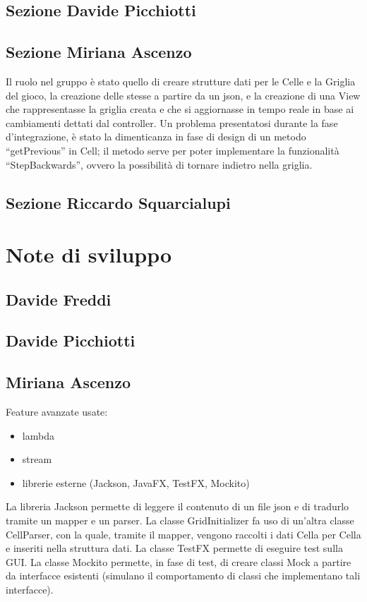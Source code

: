 \documentclass[a4paper,12pt]{report}
\begin{document}
	\subsection{Sezione Davide Picchiotti}
	\subsection{Sezione Miriana Ascenzo}

	Il ruolo nel gruppo è stato quello di creare strutture dati per le Celle e la Griglia del gioco, la creazione delle stesse a partire da un json, e la creazione di una View che rappresentasse la griglia creata e che si aggiornasse in tempo reale in base ai cambiamenti dettati dal controller.
	Un problema presentatosi durante la fase d’integrazione, è stato la dimenticanza in fase di design di un metodo “getPrevious” in Cell; il metodo serve per poter implementare la funzionalità “StepBackwards”, ovvero la possibilità di tornare indietro nella griglia.

	\subsection{Sezione Riccardo Squarcialupi}


	\section{Note di sviluppo}

	\subsection{Davide Freddi}
	\subsection{Davide Picchiotti}
	\subsection{Miriana Ascenzo}

	Feature avanzate usate:
	\begin{itemize}
		\item lambda
		\item stream
		\item librerie esterne (Jackson, JavaFX, TestFX, Mockito)
	\end {itemize}
	La libreria Jackson permette di leggere il contenuto di un file json e di tradurlo tramite un mapper e un parser.
	La classe GridInitializer fa uso di un’altra classe CellParser, con la quale, tramite il mapper, vengono raccolti i dati Cella per Cella e inseriti nella struttura dati.
	La classe TestFX permette di eseguire test sulla GUI.
	La classe Mockito permette, in fase di test, di creare classi Mock a partire da interfacce esistenti (simulano il comportamento di classi che implementano tali interfacce).
\end{document}
